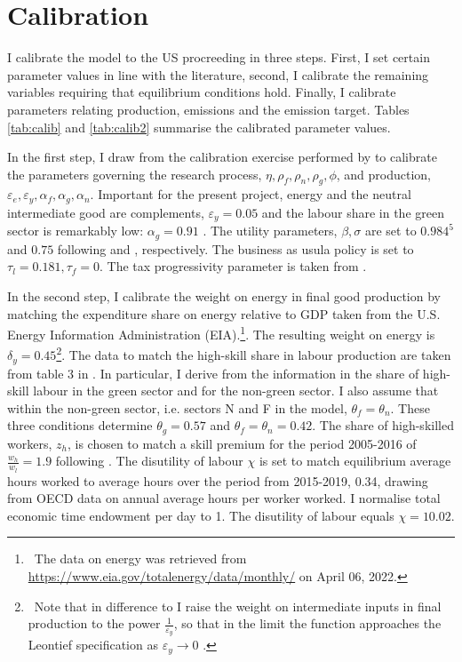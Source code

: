 \section{Calibration}\label{sec:calib}
I calibrate the model to the US procreeding in three steps. First, I set certain parameter values in line with the literature, second, I calibrate the remaining variables requiring that equilibrium conditions hold. Finally, I calibrate parameters relating production, emissions and the emission target. Tables \ref{tab:calib} and \ref{tab:calib2} summarise the calibrated parameter values.

In the first step, I draw from the calibration exercise performed by \cite{Fried2018ClimateAnalysis} to calibrate the parameters governing the research process, $\eta, \rho_f,\rho_n, \rho_g, \phi $, and production, $\varepsilon_e, \varepsilon_y, \alpha_f, \alpha_g, \alpha_n$.  Important for the present project, energy and the neutral intermediate good are complements, $\varepsilon_y=0.05$ and the labour share in the green sector is remarkably low: $\alpha_g=0.91$ \citep{Fried2018ClimateAnalysis}. The utility parameters, $\beta, \sigma$ are set to $0.984^5$ and $0.75$ following \cite{Barrage2019OptimalPolicy} and \cite{Chetty2011AreMargins}, respectively. The business as usula policy is set to $\tau_l=0.181, \tau_f=0$. The tax progressivity parameter is taken from \cite{Heathcote2017OptimalFramework}. 

In the second step, I calibrate the weight on energy in final good production by matching the expenditure share on energy relative to GDP taken from the U.S. Energy Information Administration (EIA).\footnote{\ The data on energy was retrieved from \url{https://www.eia.gov/totalenergy/data/monthly/}
 on April 06, 2022.}. The resulting weight on energy is $\delta_y=0.45$\footnote{\ Note that in difference to \cite{Fried2018ClimateAnalysis} I raise the weight on intermediate inputs in final production to the power $\frac{1}{\varepsilon_y}$, so that in the limit the function approaches the Leontief specification as $\varepsilon_y\rightarrow 0$ \citep{Herrendorf2014GrowthTransformation}.}. The data to match the high-skill share in labour production are taken from table 3 in \cite{Consoli2016DoCapital}. In particular, I derive from the information in \cite{Consoli2016DoCapital} the share of high-skill labour in the green sector and for the non-green sector. I also assume that within the non-green sector, i.e. sectors N and F in the model, $\theta_f=\theta_n$.  These three conditions determine $\theta_g=0.57$ and $\theta_f=\theta_n=0.42$. The share of high-skilled workers, $z_h$, is chosen to match a skill premium for the period 2005-2016 of $\frac{w_h}{w_l}=1.9$ following \cite{Slavik2020WagePremium}. The disutility of labour $\chi$ is set to match equilibrium average hours worked to average hours over the period from 2015-2019, 0.34, drawing from OECD data on annual average hours per worker worked. I normalise total economic time endowment per day to 1. The disutility of labour equals $\chi=10.02$. 

